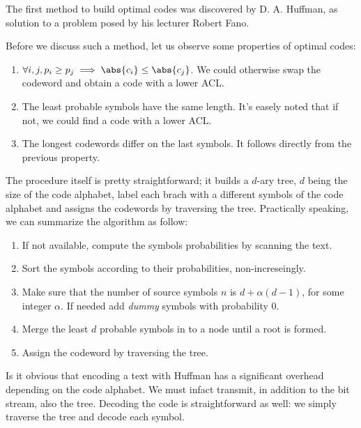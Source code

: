 \documentclass{subfiles}
\begin{document}
\label{sec:huffmanCodes}
    The first method to build optimal codes was discovered by D. A. Huffman,
        as solution to a problem posed by his lecturer Robert Fano\footnotemark.
        

    Before we discuss such a method, let us observe some properties of optimal codes:
        \begin{enumerate}
            \item \(\forall i,j, p_{i} \ge p_{j} \implies \abs{c_{i}} \le \abs{c_{j}}\).
                We could otherwise swap the codeword and obtain a code with a lower ACL.

            \item The least probable symbols have the same length.
                It's easely noted that if not, we could find a code with a lower ACL.

            \item The longest codewords differ on the last symbols.
                It follows directly from the previous property.
        \end{enumerate}

    The procedure itself is pretty straightforward; 
        it builds a \(d\)-ary tree, \(d\) being the size of the code alphabet,
        label each brach with a different symbols of the code alphabet and 
        assigns the codewords by traversing the tree.
        Practically speaking, we can summarize the algorithm as follow:
    \begin{enumerate}
        \item If not available, compute the symbols probabilities by scanning the text.
        \item Sort the symbols according to their probabilities, non-increseingly.
        \item Make sure that the number of source symbols \(n\) is \(d + \alpha(d - 1)\),
            for some integer \(\alpha\).
            If needed add \emph{dummy} symbols with probability 0.
        \item Merge the least \(d\) probable symbols in to a node until a root is formed.
        \item Assign the codeword by traversing the tree.
    \end{enumerate}

    Is it obvious that encoding a text with Huffman has a significant overhead
        depending on the code alphabet. We must infact transmit, in addition to the 
        bit stream, also the tree. Decoding the code is straightforward as well: 
        we simply traverse the tree and decode each symbol. 
\end{document}
